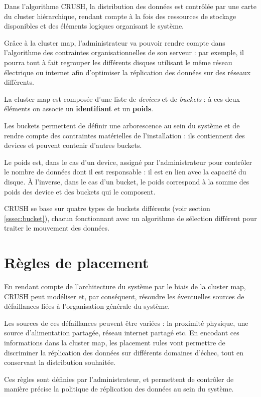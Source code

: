 Dans l'algorithme CRUSH, la distribution des données est contrôlée par une carte du cluster hiérarchique, rendant compte à la fois des ressources de stockage disponibles et des éléments logiques organisant le système.

Grâce à la cluster map, l'administrateur va pouvoir rendre compte dans l'algorithme des contraintes organisationnelles de son serveur : par exemple, il pourra tout à fait regrouper les différents disques utilisant le même réseau électrique ou internet afin d'optimiser la réplication des données sur des réseaux différents.

La cluster map est composée d'une liste de \textit{devices} et de \textit{buckets} : à ces deux éléments on associe un \textbf{identifiant} et un \textbf{poids}.

Les buckets permettent de définir une arborescence au sein du système et de rendre compte des contraintes matérielles de l’installation : ils contiennent des devices et peuvent contenir d’autres buckets.

Le poids est, dans le cas d’un device, assigné par l'administrateur pour contrôler le nombre de données dont il est responsable : il est en lien avec la capacité du disque. À l'inverse, dans le cas d’un bucket, le poids correspond à la somme des poids des device et des buckets qui le composent.

CRUSH se base sur quatre types de buckets différents (voir section \ref{sssec:bucket}), chacun fonctionnant avec un algorithme de sélection différent pour traiter le mouvement des données.

\section{Règles de placement}

En rendant compte de  l'architecture du système par le biais de la cluster map, CRUSH peut modéliser et, par conséquent, résoudre les éventuelles sources de défaillances liées à l'organisation générale du système. 

Les sources de ces défaillances peuvent être variées : la proximité physique, une source d'alimentation partagée, réseau internet partagé etc.
En encodant ces informations dans la cluster map, les placement rules vont permettre de discriminer la réplication des données sur différents domaines d'échec, tout en conservant la distribution souhaitée.

Ces règles sont définies par l'administrateur, et permettent de contrôler de manière précise la politique de réplication des données au sein du système.

